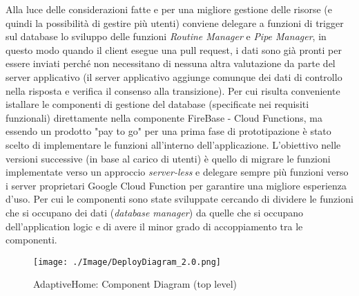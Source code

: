 \documentclass[onecolumn,a4paper]{article}
\begin{document}
Alla luce delle considerazioni fatte e per una migliore gestione delle risorse (e quindi la possibilità di gestire più utenti) conviene delegare a funzioni di trigger sul database lo sviluppo delle funzioni \emph{Routine Manager} e \emph{Pipe Manager}, in questo modo quando il client esegue una pull request, i dati sono già pronti per essere inviati perché non necessitano di nessuna altra valutazione da parte del server applicativo (il server applicativo aggiunge comunque dei dati di controllo nella risposta e verifica il consenso alla transizione). 
Per cui risulta conveniente istallare le componenti di gestione del database (specificate nei requisiti funzionali) direttamente nella componente FireBase - Cloud Functions, ma essendo un prodotto "pay to go" per una prima fase di prototipazione è stato scelto di implementare le funzioni all'interno dell'applicazione.
L'obiettivo nelle versioni successive (in base al carico di utenti) è quello di migrare le funzioni implementate verso un approccio \emph{server-less} e delegare sempre più funzioni verso i server proprietari Google Cloud Function per garantire una migliore esperienza d'uso. Per cui le componenti sono state sviluppate cercando di dividere le funzioni che si occupano dei dati (\emph{database manager}) da quelle che si occupano dell'application logic e di avere il minor grado di accoppiamento tra le componenti.

\begin{figure}[htbp]
\centering
\texttt{[image: ./Image/DeployDiagram\_2.0.png]}
\caption{\label{fig:org15d6106}AdaptiveHome: Component Diagram (top level)}
\end{figure}

\newpage
\end{document}
